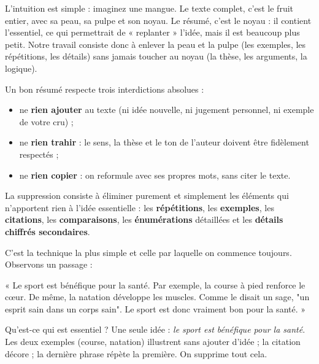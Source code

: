 \documentclass[11pt]{article}
\newcommand{\cle}[1]{{\popxbold\color{popdark}#1}}
\newcounter{popsec}
\newcounter{popsub}
\newcommand{\courssub}[1]{%
  \stepcounter{popsub}%
  \par\vspace{9pt}\noindent{\popxbold\fontsize{11.5}{13}\selectfont\color{popink}{\color{poporange}\thepopsec.\thepopsub}\hspace{6pt}#1}\par\nopagebreak\vspace{4pt}
}
\begin{document}
L'intuition est simple : imaginez une mangue. Le texte complet, c'est le fruit entier, avec sa peau, sa pulpe et son noyau. Le résumé, c'est le noyau : il contient l'essentiel, ce qui permettrait de « replanter » l'idée, mais il est beaucoup plus petit. Notre travail consiste donc à enlever la peau et la pulpe (les exemples, les répétitions, les détails) sans jamais toucher au noyau (la thèse, les arguments, la logique).

\begin{aretenir}
Un bon résumé respecte trois interdictions absolues :
\begin{itemize}
\item ne \textbf{rien ajouter} au texte (ni idée nouvelle, ni jugement personnel, ni exemple de votre cru) ;
\item ne \textbf{rien trahir} : le sens, la thèse et le ton de l'auteur doivent être fidèlement respectés ;
\item ne \textbf{rien copier} : on reformule avec ses propres mots, sans citer le texte.
\end{itemize}
\end{aretenir}

\courssub{Technique 1 : la suppression}

\begin{definition}[Suppression]
La \cle{suppression} consiste à éliminer purement et simplement les éléments qui n'apportent rien à l'idée essentielle : les \textbf{répétitions}, les \textbf{exemples}, les \textbf{citations}, les \textbf{comparaisons}, les \textbf{énumérations} détaillées et les \textbf{détails chiffrés secondaires}.
\end{definition}

C'est la technique la plus simple et celle par laquelle on commence toujours. Observons un passage :

\begin{exemplebox}
« Le sport est bénéfique pour la santé. Par exemple, la course à pied renforce le cœur. De même, la natation développe les muscles. Comme le disait un sage, "un esprit sain dans un corps sain". Le sport est donc vraiment bon pour la santé. »

Qu'est-ce qui est essentiel ? Une seule idée : \emph{le sport est bénéfique pour la santé}. Les deux exemples (course, natation) illustrent sans ajouter d'idée ; la citation décore ; la dernière phrase répète la première. On supprime tout cela.
\end{exemplebox}
\end{document}
